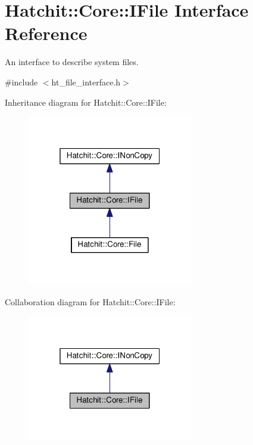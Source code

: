 \hypertarget{classHatchit_1_1Core_1_1IFile}{}\section{Hatchit\+:\+:Core\+:\+:I\+File Interface Reference}
\label{classHatchit_1_1Core_1_1IFile}


An interface to describe system files.  




{\ttfamily \#include $<$ht\+\_\+file\+\_\+interface.\+h$>$}



Inheritance diagram for Hatchit\+:\+:Core\+:\+:I\+File\+:
\nopagebreak
\begin{figure}[H]
\begin{center}
\leavevmode
\includegraphics[width=205pt]{classHatchit_1_1Core_1_1IFile__inherit__graph}
\end{center}
\end{figure}


Collaboration diagram for Hatchit\+:\+:Core\+:\+:I\+File\+:
\nopagebreak
\begin{figure}[H]
\begin{center}
\leavevmode
\includegraphics[width=205pt]{classHatchit_1_1Core_1_1IFile__coll__graph}
\end{center}
\end{figure}

